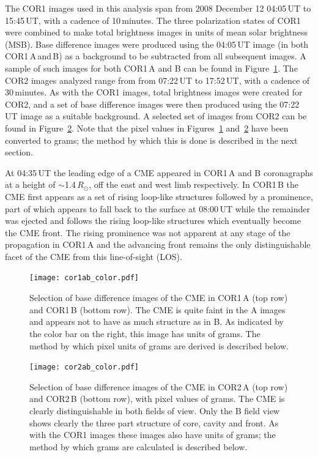 The COR1 images used in this analysis span from 2008 December 12 04:05\,UT to 15:45\,UT, with a cadence of 10\,minutes. The three polarization states of COR1 were combined to make total brightness images in units of mean solar brightness (MSB). Base difference images were produced using the 04:05\,UT image (in both COR1\,A\,and\,B) as a background to be subtracted from all subsequent images. A sample of such images for both COR1\,A and B can be found in Figure~\ref{fig:STEREO_COR1A&B}. The COR2 images analyzed range from from 07:22\,UT to 17:52\,UT, with a cadence of 30\,minutes. As with the COR1 images, total brightness images were created for COR2, and a set of base difference images were then produced using the 07:22\,UT image as a suitable background. A selected set of images from COR2 can be found in Figure~\ref{fig:STEREO_COR2A&B}. Note that the pixel values in Figures~\ref{fig:STEREO_COR1A&B} and~\ref{fig:STEREO_COR2A&B}  have been converted to grams; the method by which this is done is described in the next section.
	
At 04:35\,UT the leading edge of a CME appeared in COR1\,A and B coronagraphs at a height of $\sim$1.4\,$R_{\odot}$, off the east and west limb respectively. In COR1\,B the CME first appears as a set of rising loop-like structures followed by a prominence, part of which appears to fall back to the surface at 08:00\,UT while the remainder was ejected and follows the rising loop-like structures which eventually become the CME front. The rising prominence was not apparent at any stage of the propagation in COR1\,A and the advancing front remains the only distinguishable facet 
of the CME from this line-of-sight (LOS).
\begin{figure}
    \centering
	\texttt{[image: cor1ab\_color.pdf]}
	\caption [2008-December-12 CME observed by COR1] {Selection of base difference images of the CME in COR1\,A  
	(top row) and COR1\,B (bottom row). The CME is quite faint in the A images and appears not to have as much structure
	as in B. As indicated by the color bar on the right, this image has units of grams. The method by which pixel units of 		grams are derived is described below.}
\label{fig:STEREO_COR1A&B}
\end{figure}

\begin{figure}
    \centering
    \texttt{[image: cor2ab\_color.pdf]}
	\caption [2008-December-12 CMe observed by COR2]{Selection of base difference images of the CME in COR2\,A (top 	row) and COR2\,B (bottom row), with pixel values of grams. The CME is 
	clearly distinguishable in both fields of view. Only the B field view shows clearly the three part structure of core, cavity 	and front. As with the COR1 images these images also have units of grams; the method by which grams are calculated 	is described below.}
\label{fig:STEREO_COR2A&B}
\end{figure}    

